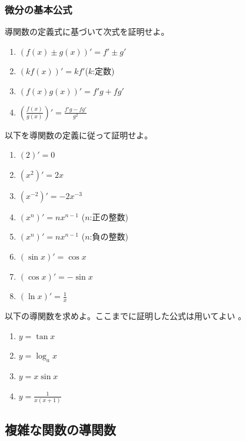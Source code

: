 \documentclass[twocolumn,11pt]{jarticle}
\begin{document}
\subsubsection{微分の基本公式}

\nquestion
導関数の定義式に基づいて次式を証明せよ。
\begin{enumerate}
\item $(f(x)\pm g(x))'=f'\pm g'$
\item $(kf(x))'=kf'$\quad($k$:定数)
\item $(f(x)g(x))'=f'g+fg'$
\item $\displaystyle\left(\frac{f(x)}{g(x)}\right)'=\frac{f'g-fg'}{g^2}$
\end{enumerate}

\nquestion
以下を導関数の定義に従って証明せよ。
\begin{enumerate}
\item $(2)'=0$
\item $(x^2)'=2x$
\item $(x^{-2})'=-2x^{-3}$
\item $(x^n)'=nx^{n-1}$ ($n$:正の整数)
\item $(x^n)'=nx^{n-1}$ ($n$:負の整数)
\item $(\sin x)'=\cos x$
\item $(\cos x)'=-\sin x$
\item $\displaystyle (\ln x)'=\frac{1}{x}$
\end{enumerate}

\nquestion
以下の導関数を求めよ。ここまでに証明した公式は用いてよい
。
\begin{enumerate}
\item $y=\tan x$
\item $y=\log_a x$
\item $y=x\sin x$
\item $\displaystyle y=\frac{1}{x(x+1)}$
\end{enumerate}

\subsection{複雑な関数の導関数}
\end{document}
